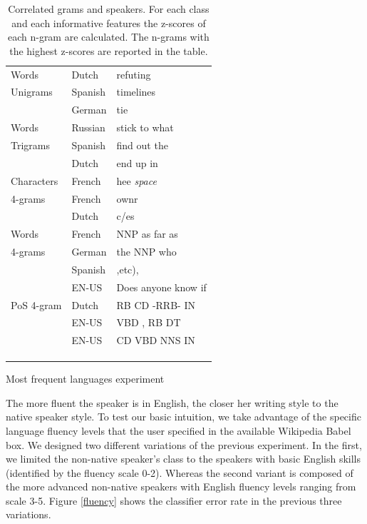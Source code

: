\documentclass[10pt,a5paper,twoside]{article}
\begin{document}
\begin{table}[t]
\begin{subtable}[]{0.5\textwidth}
\begin{tabular}{l|ll}
   Words &Dutch& refuting\\
      Unigrams&Spanish&timelines\\
       &German& tie\\\hline

   Words&Russian& stick to what\\
   Trigrams&Spanish& find out the\\
   &Dutch& end up in\\\hline

   Characters &French& hee \emph{space}\\
   4-grams      &French&ownr\\
&Dutch&c/es\\
   \hline
   Words &French& NNP as far as\\
   4-grams &German& the NNP who\\
   &Spanish& ,etc),\\
   &EN-US& Does anyone know if\\\hline
   PoS 4-gram &Dutch& RB CD -RRB- IN \\
   &EN-US& VBD , RB DT\\
   &EN-US& CD VBD NNS IN\\
   && \\
   && \\
   && \\
   \end{tabular}
   \caption{Most frequent languages experiment}
   \label{table:frequent}
   \end{subtable}
\label{table:analysis}
\caption{Correlated grams and speakers. For each class and each informative
features the z-scores of each n-gram are calculated. The n-grams with the
highest z-scores are reported in the table.}
\end{table}

The more fluent the speaker is in English, the closer her writing
style to the native speaker style. To test our basic intuition,
we take advantage of the specific language fluency levels that the user
specified in the available Wikipedia Babel box. We designed two different
variations of the previous experiment. In the first, we limited
the non-native speaker's class to the speakers with basic English skills
(identified by the fluency scale 0-2).
Whereas the second variant is composed of the more advanced non-native speakers with
English fluency levels ranging from scale 3-5.
Figure \ref{fluency} shows the classifier error rate in the previous three
variations.
\end{document}
